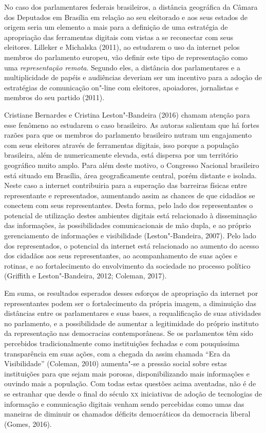 No caso dos parlamentares federais brasileiros, a distância geográfica
da Câmara dos Deputados em Brasília em relação ao seu eleitorado e aos
seus estados de origem seria um elemento a mais para a definição de uma
estratégia de apropriação das ferramentas digitais com vistas a se
reconectar com seus eleitores. Lilleker e Michalska (2011), ao estudarem
o uso da internet pelos membros do parlamento europeu, vão definir este
tipo de representação como uma \emph{representação remota}. Segundo
eles, a distância dos parlamentares e a multiplicidade de papéis e
audiências deveriam ser um incentivo para a adoção de estratégias de
comunicação on"-line com eleitores, apoiadores, jornalistas e membros do
seu partido (2011).

Cristiane Bernardes e Cristina Leston"-Bandeira (2016) chamam atenção
para esse fenômeno ao estudarem o caso brasileiro. As autoras salientam
que há fortes razões para que os membros do parlamento brasileiro nutram
um engajamento com seus eleitores através de ferramentas digitais, isso
porque a população brasileira, além de numericamente elevada, está
dispersa por um território geográfico muito amplo. Para além deste
motivo, o Congresso Nacional brasileiro está situado em Brasília, área
geograficamente central, porém distante e isolada. Neste caso a internet
contribuiria para a superação das barreiras físicas entre representante
e representados, aumentando assim as chances de que cidadãos se conectem
com seus representantes. Desta forma, pelo lado dos representantes o
potencial de utilização destes ambientes digitais está relacionado à
disseminação das informações, às possibilidades comunicacionais de mão
dupla, e ao próprio gerenciamento de informações e visibilidade
(Leston"-Bandeira, 2007). Pelo lado dos representados, o potencial da
internet está relacionado ao aumento do acesso dos cidadãos aos seus
representantes, ao acompanhamento de suas ações e rotinas, e ao
fortalecimento do envolvimento da sociedade no processo político
(Griffith e Leston"-Bandeira, 2012; Coleman, 2017).

Em suma, os resultados esperados desses esforços de apropriação da
internet por representantes podem ser o fortalecimento da própria
imagem, a diminuição das distâncias entre os parlamentares e suas bases,
a requalificação de suas atividades no parlamento, e a possibilidade de
aumentar a legitimidade do próprio instituto da representação nas
democracias contemporâneas. Se os parlamentos têm sido percebidos
tradicionalmente como instituições fechadas e com pouquíssima
transparência em suas ações, com a chegada da assim chamada ``Era da
Visibilidade'' (Coleman, 2010) aumenta"-se a pressão social sobre estas
instituições para que sejam mais porosas, disponibilizando mais
informações e ouvindo mais a população. Com todas estas questões acima
aventadas, não é de se estranhar que desde o final do século \textsc{xx}
iniciativas de adoção de tecnologias de informação e comunicação
digitais venham sendo percebidas como umas das maneiras de diminuir os
chamados déficits democráticos da democracia liberal (Gomes, 2016).

